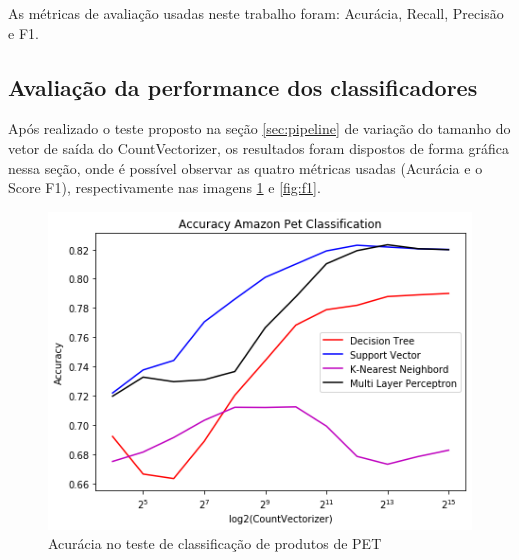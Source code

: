 \documentclass[conference]{IEEEtran}
\begin{document}
		
		As métricas de avaliação usadas neste trabalho foram: Acurácia, Recall, Precisão e F1.
		
%		
%		
%		
%		
%		
%		
	
	\subsection{Avaliação da performance dos classificadores}
	
	
	Após realizado o teste proposto na seção \ref{sec:pipeline} de variação do tamanho do vetor de saída do CountVectorizer, os resultados foram dispostos de forma gráfica nessa seção, onde é possível observar as quatro métricas usadas (Acurácia e o Score F1), respectivamente nas imagens \ref{fig:acc} e \ref{fig:f1}.
	
	\begin{figure}[H]
		\centering
		\includegraphics[width=\linewidth]{Images/ACC}
		\caption{Acurácia no teste de classificação de produtos de PET}
		\label{fig:acc}
	\end{figure}
\end{document}
